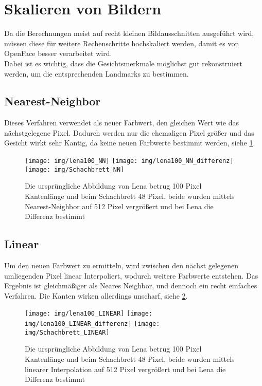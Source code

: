 \section{Skalieren von Bildern}
\label{scale_Algos}
Da die Berechnungen meist auf recht kleinen Bildausschnitten ausgeführt wird, müssen diese für weitere Rechenschritte hochskaliert werden, damit es von OpenFace besser verarbeitet wird.\\
Dabei ist es wichtig, dass die Gesichtsmerkmale möglichst gut rekonstruiert werden, um die entsprechenden Landmarks zu bestimmen.
\subsection{Nearest-Neighbor}
Dieses Verfahren verwendet als neuer Farbwert, den gleichen Wert wie das nächstgelegene Pixel. Dadurch werden nur die ehemaligen Pixel größer und das Gesicht wirkt sehr Kantig, da keine neuen Farbwerte bestimmt werden, siehe \ref{img_NN}.
\begin{figure}
	\centering
	\texttt{[image: img/lena100\_NN]}
	\texttt{[image: img/lena100\_NN\_differenz]}
	\texttt{[image: img/Schachbrett\_NN]}
	\caption{Die ursprüngliche Abbildung von Lena betrug 100 Pixel Kantenlänge und beim Schachbrett 48 Pixel, beide wurden mittels Nearest-Neighbor auf 512 Pixel vergrößert und bei Lena die Differenz bestimmt}
	\label{img_NN}
\end{figure}
\subsection{Linear}
Um den neuen Farbwert zu ermitteln, wird zwischen den nächst gelegenen umliegenden Pixel linear Interpoliert, wodurch weitere Farbwerte entstehen. Das Ergebnis ist gleichmäßiger als Neares Neighbor, und dennoch ein recht einfaches Verfahren. Die Kanten wirken allerdings unscharf, siehe \ref{img_Linear}.
\begin{figure}
	\centering
	\texttt{[image: img/lena100\_LINEAR]}
	\texttt{[image: img/lena100\_LINEAR\_differenz]}
	\texttt{[image: img/Schachbrett\_LINEAR]}
	\caption{Die ursprüngliche Abbildung von Lena betrug 100 Pixel Kantenlänge und beim Schachbrett 48 Pixel, beide wurden mittels linearer Interpolation auf 512 Pixel vergrößert und bei Lena die Differenz bestimmt}
	\label{img_Linear}
\end{figure}
